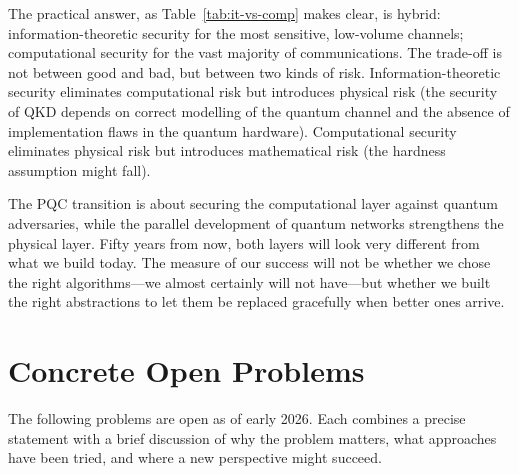 The practical answer, as Table~\ref{tab:it-vs-comp} makes clear, is hybrid: information-theoretic security for the most sensitive, low-volume channels; computational security for the vast majority of communications.  The trade-off is not between good and bad, but between two kinds of risk.  Information-theoretic security eliminates computational risk but introduces physical risk (the security of QKD depends on correct modelling of the quantum channel and the absence of implementation flaws in the quantum hardware).  Computational security eliminates physical risk but introduces mathematical risk (the hardness assumption might fall).

The PQC transition is about securing the computational layer against quantum adversaries, while the parallel development of quantum networks strengthens the physical layer.  Fifty years from now, both layers will look very different from what we build today.  The measure of our success will not be whether we chose the right algorithms---we almost certainly will not have---but whether we built the right abstractions to let them be replaced gracefully when better ones arrive.


\section{Concrete Open Problems}
\label{sec:open-problem-list}

The following problems are open as of early 2026.  Each combines a precise statement with a brief discussion of why the problem matters, what approaches have been tried, and where a new perspective might succeed.

